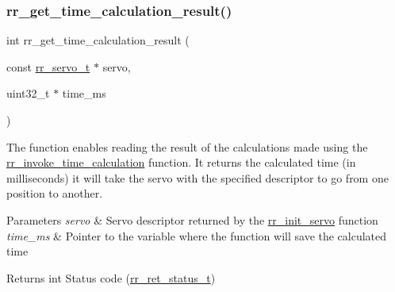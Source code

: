 \subsubsection{\texorpdfstring{rr\+\_\+get\+\_\+time\+\_\+calculation\+\_\+result()}{rr\_get\_time\_calculation\_result()}}
{\footnotesize\ttfamily int rr\+\_\+get\+\_\+time\+\_\+calculation\+\_\+result (\begin{DoxyParamCaption}\item[{const \hyperlink{structrr__servo__t}{rr\+\_\+servo\+\_\+t} $\ast$}]{servo,  }\item[{uint32\+\_\+t $\ast$}]{time\+\_\+ms }\end{DoxyParamCaption})}



The function enables reading the result of the calculations made using the \hyperlink{group___trajectory_gabaa2275097c9ec4bb2807b65d83e3303}{rr\+\_\+invoke\+\_\+time\+\_\+calculation} function. It returns the calculated time (in milliseconds) it will take the servo with the specified descriptor to go from one position to another. 


\begin{DoxyParams}{Parameters}
{\em servo} & Servo descriptor returned by the \hyperlink{group___init_ga0adb313a3eeb8a4399431e940a1f3e9e}{rr\+\_\+init\+\_\+servo} function \\
\hline
{\em time\+\_\+ms} & Pointer to the variable where the function will save the calculated time \\
\hline
\end{DoxyParams}
\begin{DoxyReturn}{Returns}
int Status code (\hyperlink{api_8h_a92d5be5038abcf89837faf85a08debdc}{rr\+\_\+ret\+\_\+status\+\_\+t}) 
\end{DoxyReturn}
\mbox{\label{group___trajectory_gabaa2275097c9ec4bb2807b65d83e3303}} 
